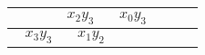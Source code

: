 \begin{center}
\begin{tabular}{|c|c|c|c|c|c|c|c|}
\hspace{15pt} & \multicolumn{2}{c|}{$x_2y_3$} & \multicolumn{2}{c|}{$x_0y_3$} & \hspace{15pt} & \hspace{15pt} & \hspace{15pt} \\ \hline
\multicolumn{2}{|c|}{$x_3y_3$} & \multicolumn{2}{c|}{$x_1y_2$} & \hspace{15pt} & \hspace{15pt} & \hspace{15pt} & \hspace{15pt} \\ \hline
\end{tabular}
\end{center}


